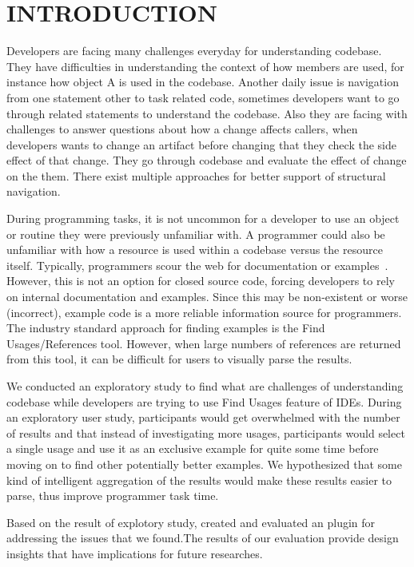 \documentclass[conference]{IEEEtran}
\begin{document}
\section{INTRODUCTION}
Developers are facing many challenges everyday for understanding codebase. They have difficulties in understanding the context of how members are used, for instance how object A is used in the codebase. Another daily issue is navigation from one statement other to task related code, sometimes developers want to go through related statements to understand the codebase. Also they are facing with challenges to answer questions about how a change affects callers, when developers wants to change an artifact before changing that they check the side effect of that change. They go through codebase and evaluate the effect of change on the them. There exist multiple approaches for better support of structural navigation.\par
During programming tasks, it is not uncommon for a developer to use an object or routine they were previously unfamiliar with. A programmer could also be unfamiliar with how a resource is used within a codebase versus the resource itself. Typically, programmers scour the web for documentation or examples~\cite{brandt2009two}. However, this is not an option for closed source code, forcing developers to rely on internal documentation and examples. Since this may be non-existent or worse (incorrect), example code is a more reliable information source for programmers. The industry standard approach for finding examples is the Find Usages/References tool. However, when large numbers of references are returned from this tool, it can be difficult for users to visually parse the results.\par
We conducted an exploratory study to find what are challenges of understanding codebase while developers are trying to use Find Usages feature of IDEs. During an exploratory user study, participants would get overwhelmed with the number of results and that instead of investigating more usages, participants would select a single usage and use it as an exclusive example for quite some time before moving on to find other potentially better examples.
We hypothesized that some kind of intelligent aggregation of the results would make these results easier to parse, thus improve programmer task time.\par
Based on the result of explotory study, created and evaluated an plugin for addressing the issues that we found.The results of our evaluation provide design insights that have implications for future researches.\par
\end{document}
